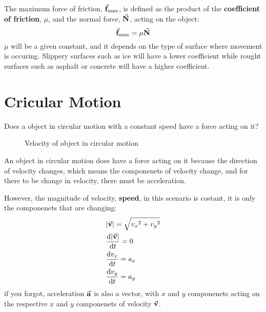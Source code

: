 \documentclass{article}
\begin{document}
The maximum force of friction, $\va{f}_\mathrm{max}$, is defined as the product of 
the \textbf{coefficient of friction}, $\mu$, and the normal force, $\va{N}$, acting on 
the object:
\[ \va{f}_\mathrm{max} = \mu\va{N} \]
$\mu$ will be a given constant, and it depends on the type of surface where movement is
occuring. Slippery surfaces such as ice will have a lower coefficient while rought 
surfaces such as asphalt or concrete will have a higher coefficient.

\newpage
\section{Cricular Motion}
Does a object in circular motion with a constant speed have a force acting on it?
\begin{figure}[h]
    \centering
    \label{fig:3}
    \caption{Velocity of object in circular motion}
\end{figure}

\noindent An object in circular motion does have a force acting on it because 
the direction of velocity changes, which means the componenets of velocity change,
and for there to be change in velocity, there must be acceleration. 

However, the magnitude of velocity, \textbf{speed}, in this scenario is costant, 
it is only the componenets that are changing:
\begin{align*}
    &\abs{\va{v}} = \sqrt{{v_x}^2 + {v_y}^2} \\
    &\derivative{\abs{\va{v}}}{t} = 0 \\
    &\derivative{v_x}{t} = a_x \\
    &\derivative{v_y}{t} = a_y
\end{align*}
if you forgot, acceleration $\va{a}$ is also a vector, with $x$ and $y$ componenets acting 
on the respective $x$ and $y$ componenets of velocity $\va{v}$.
\end{document}
